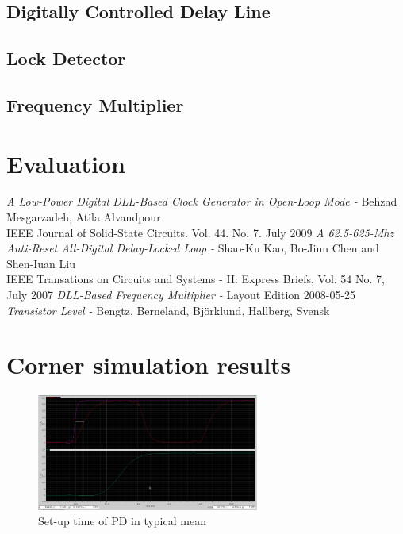 \documentclass[a4paper,12pt]{article} \usepackage{graphicx}
\begin{document}
\subsection{Digitally Controlled Delay Line}
\subsection{Lock Detector}
\subsection{Frequency Multiplier}

\section{Evaluation}

\newpage
\appendix 
\newpage

\begin{thebibliography}{99}
        \textit{A Low-Power Digital DLL-Based Clock Generator in Open-Loop Mode - }
                Behzad Mesgarzadeh, Atila Alvandpour \\
                IEEE Journal of Solid-State Circuits. Vol. 44. No. 7. July 2009
        \textit{A 62.5-625-Mhz Anti-Reset All-Digital Delay-Locked Loop - }
                Shao-Ku Kao, Bo-Jiun Chen and Shen-Iuan Liu \\
                IEEE Transations on Circuits and Systems - II: Express Briefs, Vol. 54 No. 7, July 2007
        \textit{DLL-Based Frequency Multiplier - }
                Layout Edition 2008-05-25 \\
        \textit{Transistor Level - }
                Bengtz, Berneland, Björklund, Hallberg, Svensk \\

\end{thebibliography}

\newpage
\section{Corner simulation results}
\label{sec:corners}

\begin{figure}[h]
  \centering
  \includegraphics[width=0.65\textwidth]{../Bilder/Layout/simulations/pd_tm.png}
  \caption{Set-up time of PD in typical mean}
  \label{fig:PDtm}
\end{figure}
\end{document}

